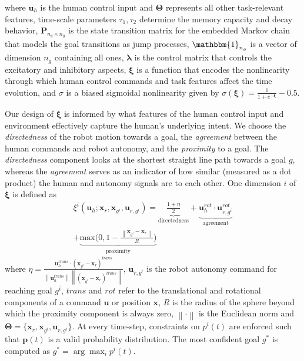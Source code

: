 \documentclass[journal]{IEEEtran}
\newcommand{\argmax}{\arg\!\max}
\newcommand{\norm}[1]{\left\lVert#1\right\rVert}
\begin{document}
where $\boldsymbol{u}_h$ is the human control input and $\boldsymbol{\Theta}$ represents all other task-relevant features, time-scale parameters $\tau_1, \tau_2$ determine the memory capacity and decay behavior, $\boldsymbol{P}_{n_g\times n_g}$ is the state transition matrix for the embedded Markov chain that models the goal transitions as jump processes, $\mathbbm{1}_{n_g}$ is a vector of dimension $n_g$ containing all ones, $\boldsymbol{\lambda}$ is the control matrix that controls the excitatory and inhibitory aspects, $\boldsymbol{\xi}$ is a function that encodes the nonlinearity through which human control commands and task features affect the time evolution, and $\sigma$ is a biased sigmoidal nonlinearity given by $\sigma(\boldsymbol{\xi}) = \frac{1}{1 + e^{-\boldsymbol{\xi}}} - 0.5$. 


Our design of $\boldsymbol{\xi}$ is informed by what features of the human control input and environment effectively capture the human's underlying intent. We choose the \textit{directedness} of the robot motion towards a goal, the \textit{agreement} between the human commands and robot autonomy, and the \textit{proximity} to a goal. The \textit{directedness} component looks at the shortest straight line path towards a goal $g$, whereas the \textit{agreement} serves as an indicator of how similar (measured as a dot product) the human and autonomy signals are to each other.
 One dimension $i$ of $\boldsymbol{\xi}$ is defined as 
\begin{multline*}
\xi^i(\boldsymbol{u}_h;\boldsymbol{x}_r, \boldsymbol{x}_{g^i}, \boldsymbol{u}_{r, g^i}) = \underbrace{\frac{1 + \eta}{2}}_{\text{directedness}} + \underbrace{\boldsymbol{u}_{h}^{rot}\cdot\boldsymbol{u}_{r,g^i}^{rot}}_{\text{agreement}}
\\+ \underbrace{\text{max}\Big(0, 1-\frac{\norm{\boldsymbol{x}_{g^i} - \boldsymbol{x}_r}}{R}\Big)}_{\text{proximity}}
\end{multline*}
where  $\eta = \frac{\boldsymbol{u}_h^{trans}\cdot(\boldsymbol{x}_{g^i} - \boldsymbol{x}_r)^{trans}}{\norm{\boldsymbol{u}_h^{trans}}\norm{(\boldsymbol{x}_{g^i} - \boldsymbol{x}_r)^{trans}}}$, $\boldsymbol{u}_{r,g^i}$ is the robot autonomy command for reaching goal $g^i$, $trans$ and $rot$ refer to the translational and rotational components of a command $\boldsymbol{u}$ or position $\boldsymbol{x}$,  $R$ is the radius of the sphere beyond which the proximity component is always zero, $\norm{\cdot}$ is the Euclidean norm and $\boldsymbol{\Theta} = \{\boldsymbol{x}_r, \boldsymbol{x}_{g^i}, \boldsymbol{u}_{r, g^i}\}$.
At every time-step, constraints on $p^i(t)$ are enforced such that $\boldsymbol{p}(t)$ is a valid probability distribution. 
The most confident goal $g^*$ is computed as $g^* = \argmax_i  p^i(t)$.
\end{document}
